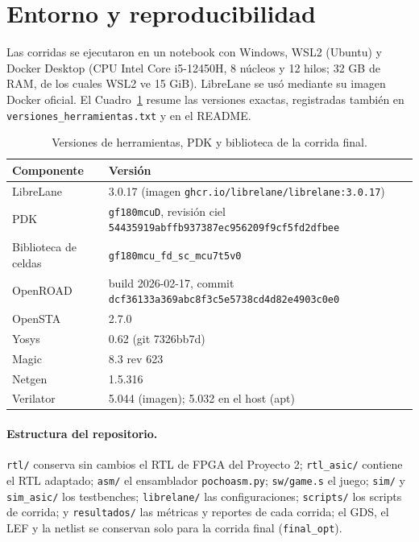 \documentclass[11pt,letterpaper]{article}
\newcommand{\code}[1]{\texttt{#1}}
\newcommand{\fuente}{\par\vspace{3pt}{\footnotesize\emph{Fuente: Elaboración propia.}}\par}
\begin{document}
\section{Entorno y reproducibilidad}
\label{sec:repro}

Las corridas se ejecutaron en un notebook con Windows, WSL2 (Ubuntu) y Docker Desktop (CPU Intel Core i5-12450H, 8 núcleos y 12 hilos; 32 GB de RAM, de los cuales WSL2 ve 15 GiB). LibreLane se usó mediante su imagen Docker oficial. El Cuadro~\ref{tab:versiones} resume las versiones exactas, registradas también en \code{versiones\_herramientas.txt} y en el README.

\begin{table}[H]
\centering
\caption{Versiones de herramientas, PDK y biblioteca de la corrida final.}
\label{tab:versiones}
\begin{tabular}{ll}
\toprule
\textbf{Componente} & \textbf{Versión}\\
\midrule
LibreLane & 3.0.17 (imagen \code{ghcr.io/librelane/librelane:3.0.17})\\
PDK & \code{gf180mcuD}, revisión ciel \code{54435919abffb937387ec956209f9cf5fd2dfbee}\\
Biblioteca de celdas & \code{gf180mcu\_fd\_sc\_mcu7t5v0}\\
OpenROAD \cite{openroad} & build 2026-02-17, commit \code{dcf36133a369abc8f3c5e5738cd4d82e4903c0e0}\\
OpenSTA & 2.7.0\\
Yosys & 0.62 (git 7326bb7d)\\
Magic & 8.3 rev 623\\
Netgen & 1.5.316\\
Verilator & 5.044 (imagen); 5.032 en el host (apt)\\
\bottomrule
\end{tabular}
\fuente
\end{table}

\paragraph{Estructura del repositorio.} \code{rtl/} conserva sin cambios el RTL de FPGA del Proyecto 2; \code{rtl\_asic/} contiene el RTL adaptado; \code{asm/} el ensamblador \code{pochoasm.py}; \code{sw/game.s} el juego; \code{sim/} y \code{sim\_asic/} los testbenches; \code{librelane/} las configuraciones; \code{scripts/} los scripts de corrida; y \code{resultados/} las métricas y reportes de cada corrida; el GDS, el LEF y la netlist se conservan solo para la corrida final (\code{final\_opt}).
\end{document}
